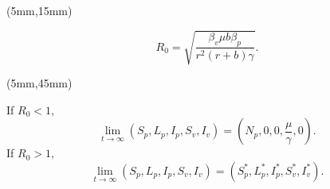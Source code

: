	\begin{frame}
		\begin{textblock*}{50mm}(5mm,15mm)
			\begin{greenbox}{}
				\begin{equation*}
				R_0=\sqrt{\frac{\beta_v\mu b\beta_p}{r^2(r+b)\gamma}}.
				\end{equation*}
			\end{greenbox}
			
			\begin{textblock*}{70mm}(5mm,45mm)
				\begin{yellowbox}{}
				\only<1>
				{	
					If $R_0<1,$
					\begin{equation*}
					\lim\limits_{t\rightarrow \infty}(S_p,L_p,I_p,S_v,I_v)=(N_p,0,0,\frac{\mu}{\gamma},0).
					\end{equation*}
				}
				\only<2>
				{
					If $R_0>1,$
					\begin{equation*}
						\lim\limits_{t\rightarrow \infty}(S_p,L_p,I_p,S_v,I_v)=(S_p^*,L_p^*,I_p^*,S_v^*,I_v^*).
					\end{equation*}
				}
				\end{yellowbox}
			\end{textblock*}
			

\end{textblock*}
\end{frame}
